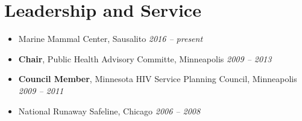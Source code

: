 \documentclass[11pt]{article}
\newcommand{\rside}[1]{
  \hfill {\itshape #1}%
}
\begin{document}
\section{Leadership and Service}
\begin{itemize}
    \renewcommand{\labelitemi}{}
    \setlength{\leftskip}{-1.5em}
    \item Marine Mammal Center, Sausalito \rside{2016 -- present}
    \item \textbf{Chair}, Public Health Advisory Committe, Minneapolis \rside{2009 -- 2013}
    \item \textbf{Council Member}, Minnesota HIV Service Planning Council, Minneapolis \rside{2009 -- 2011}
    \item National Runaway Safeline, Chicago \rside{2006 -- 2008}
\end{itemize}
\end{document}
